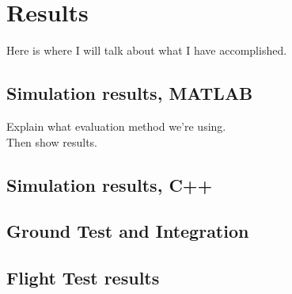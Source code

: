 \chapter{Results}

\par Here is where I will talk about what I have accomplished.
\section{Simulation results, MATLAB}
Explain what evaluation method we're using. \\
Then show results.
\section{Simulation results, C++}
\section{Ground Test and Integration}
\section{Flight Test results}